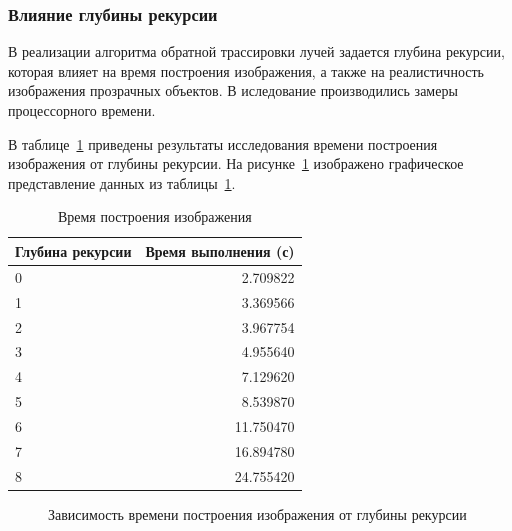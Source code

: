 \subsubsection*{Влияние глубины рекурсии}

В реализации алгоритма обратной трассировки лучей задается глубина рекурсии, которая влияет на время построения изображения, а также на реалистичность изображения прозрачных объектов. В иследование производились замеры процессорного времени.

В таблице~\ref{rec-d} приведены результаты исследования времени построения изображения от глубины рекурсии. На рисунке~\ref{grp:dr} изображено графическое представление данных из таблицы~\ref{rec-d}.

\setcounter{table}{3}
\begin{table}[ht!]
	\begin{center}
		\caption{Время построения изображения}
		\begin{tabular}{ ||p{4cm}|r||  }
			\hline
			\multirow{1}{*}{Глубина рекурсии}& \multicolumn{1}{c||}{Время выполнения (с)} \\[1.5ex]
			\hline\hline
			0 & 2.709822 \\
			1  & 3.369566 \\
			2 &  3.967754 \\
			3 & 4.955640 \\
			4 & 7.129620 \\
			5 & 8.539870 \\
			6  & 11.750470 \\
			7 & 16.894780 \\
			8 & 24.755420 \\
			\hline
		\end{tabular}
		\label{rec-d}
	\end{center}
\end{table}

\begin{figure}[ht!]
	\begin{center}
	\end{center}
	\caption{Зависимость времени построения изображения от глубины рекурсии}
	\label{grp:dr}
\end{figure}

